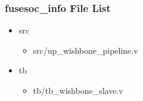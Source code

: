 \subsubsection{fusesoc\_info File List}
\begin{itemize}
\item src
	\begin{itemize}
	\item src/up\_wishbone\_pipeline.v
	\end{itemize}
\item tb
	\begin{itemize}
	\item tb/tb\_wishbone\_slave.v
	\end{itemize}
\end{itemize}
